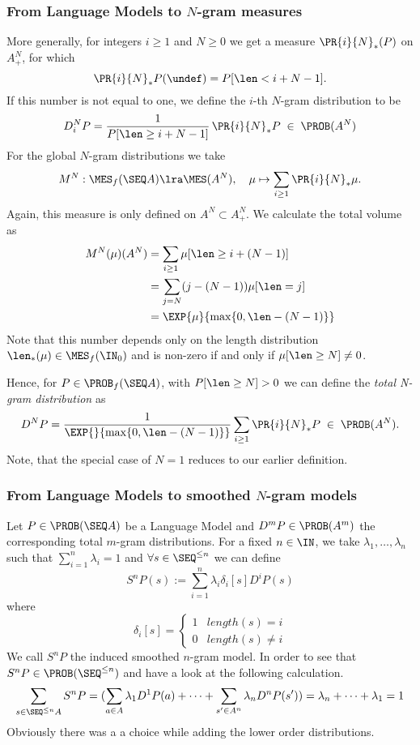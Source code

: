 \documentclass[11pt]{article}
\begin{document}

\subsubsection{From Language Models to $N$-gram measures}

More generally, for integers $i \geq 1$ and $N \geq 0$ we get a
measure $\PR{i}{N}_*(P)$ on $A^N_+$, for which
\[ \PR{i}{N}_* P (\undef) =  P[\len < i + N -1]. \]
If this number is not equal to one, we define the $i$-th $N$-gram
distribution to be
\[ D_i^N P = \frac{1}{P[\len \geq i+N-1]} \, 
             \PR{i}{N}_* P \;\in\; \PROB(A^N) \]
For the global $N$-gram distributions we take
\[ M^N: \MES_f(\SEQ A) \lra \MES(A^N), \quad \mu \mapsto \sum_{i
\geq 1} \PR{i}{N}_* \mu. \]
Again, this measure is only defined on $A^N \subset A^N_+$.
We calculate the total volume as
\begin{align} 
  M^N(\mu)(A^N) &= \sum_{i \geq 1} \mu[\len \geq i + (N-1)] \\
                &= \sum_{j = N} (j-(N-1)) \mu[\len = j]    \\
                &= \EXP{\mu}{\max\{ 0, \len - (N-1) \} }  
\end{align}
Note that this number depends only on the length distribution
$\len_*(\mu) \in \MES_f(\IN_0)$ and is non-zero if and only if
$\mu[\len \geq N] \neq 0$. 

Hence, for $P \in \PROB_f(\SEQ A)$, with $P[\len \geq N] > 0$ we can define the
{\it total N-gram distribution} as
\[ D^N P = \frac{1}{\EXP{}{\max\{ 0, \len - (N-1) \} }}
           \sum_{i \geq 1} \PR{i}{N}_* P \;\in\; \PROB(A^N). \]
Note, that the special case of $N=1$ reduces to our earlier definition.

\subsubsection{From Language Models to smoothed $N$-gram models}
Let $P \in \PROB(\SEQ A)$ be a Language Model and $D^mP \in \PROB (A^m)$ the corresponding total $m$-gram distributions. 
For a fixed $n\in \IN$, we take $\lambda_1,\dots,\lambda_n$ such that $\sum_{i=1}^n\lambda_i=1$ and $\forall s\in\SEQ^{\leq n}$ we can define 
\[S^nP(s):=\sum_{i=1}^n\lambda_i\delta_{i}[s]D^iP(s) \]
where
\[\delta_i[s]=
\begin{cases}
1  & length(s) = i  \\
0  & length(s) \neq i
\end{cases}\]
We call $S^nP$ the induced smoothed $n$-gram model. 
In order to see that $S^nP\in\PROB(\SEQ^{\leq n})$ and have a look at the following calculation.
\[\sum_{s\in\SEQ^{\leq n}A}S^nP = (\sum_{a\in A}\lambda_1D^1P(a) + \dots + \sum_{s'\in A^n}\lambda_nD^nP(s') ) = \lambda_n+\dots+\lambda_1 = 1\]
Obviously there was a a choice while adding the lower order distributions. 
\end{document}
